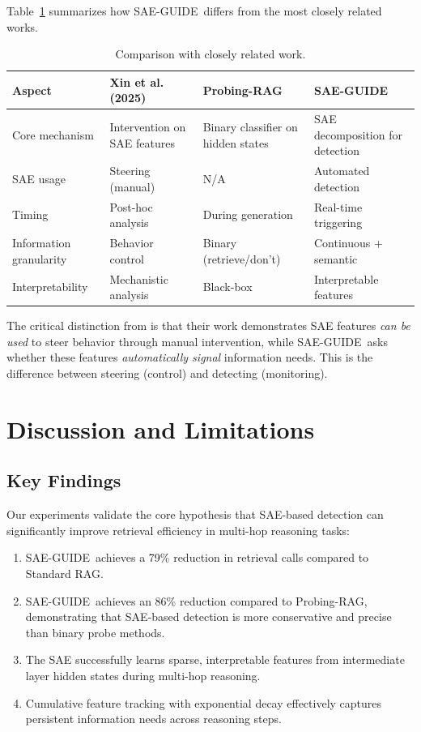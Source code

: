 \documentclass{article}
\newcommand{\ours}{SAE-GUIDE}
\begin{document}
Table~\ref{tab:comparison} summarizes how \ours\ differs from the most closely related works.

\begin{table}[t]
\caption{Comparison with closely related work.}
\label{tab:comparison}
\centering
\small
\begin{tabular}{p{2.2cm}p{3cm}p{3cm}p{3cm}}
\toprule
Aspect & Xin et al. (2025) & Probing-RAG & \ours \\
\midrule
Core mechanism & Intervention on SAE features & Binary classifier on hidden states & SAE decomposition for detection \\
SAE usage & Steering (manual) & N/A & Automated detection \\
Timing & Post-hoc analysis & During generation & Real-time triggering \\
Information granularity & Behavior control & Binary (retrieve/don't) & Continuous + semantic \\
Interpretability & Mechanistic analysis & Black-box & Interpretable features \\
\bottomrule
\end{tabular}
\end{table}

The critical distinction from \citet{xin-etal-2025-sparse} is that their work demonstrates SAE features \textit{can be used} to steer behavior through manual intervention, while \ours\ asks whether these features \textit{automatically signal} information needs. This is the difference between steering (control) and detecting (monitoring).

\section{Discussion and Limitations}
\label{sec:discussion}

\subsection{Key Findings}

Our experiments validate the core hypothesis that SAE-based detection can significantly improve retrieval efficiency in multi-hop reasoning tasks:

\begin{enumerate}
    \item \ours\ achieves a 79\% reduction in retrieval calls compared to Standard RAG.
    \item \ours\ achieves an 86\% reduction compared to Probing-RAG, demonstrating that SAE-based detection is more conservative and precise than binary probe methods.
    \item The SAE successfully learns sparse, interpretable features from intermediate layer hidden states during multi-hop reasoning.
    \item Cumulative feature tracking with exponential decay effectively captures persistent information needs across reasoning steps.
\end{enumerate}
\end{document}
